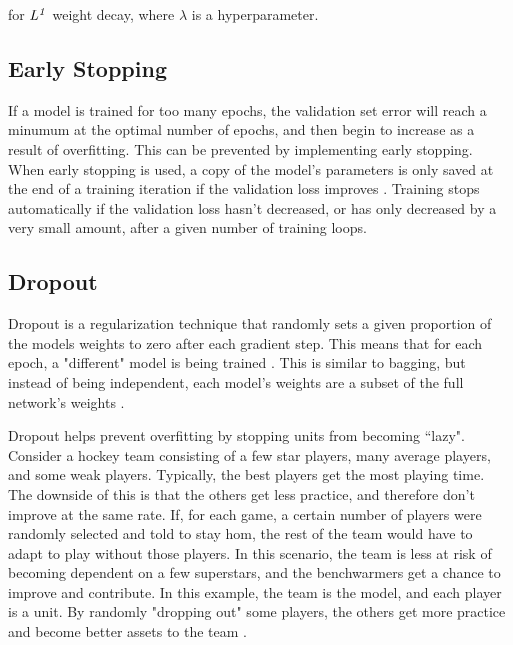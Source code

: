 \documentclass{article}
\begin{document}
for \(\it{L}^1\) weight decay, where \(\lambda\) is a hyperparameter.

\subsection{Early Stopping} %

If a model is trained for too many epochs, the validation set error will reach a minumum at the optimal number of epochs, and then begin to increase as a result of overfitting. This can be prevented by implementing early stopping. When early stopping is used, a copy of the model's parameters is only saved at the end of a training iteration if the validation loss improves \cite{Goodfellow-et-al-2016}. Training stops automatically if the validation loss hasn't decreased, or has only decreased by a very small amount, after a given number of training loops.

\subsection{Dropout} %

Dropout is a regularization technique that randomly sets a given proportion of the models weights to zero after each gradient step. This means that for each epoch, a "different" model is being trained \cite{Srivastava14}. This is similar to bagging, but instead of being independent, each model's weights are a subset of the full network's weights \cite{Goodfellow-et-al-2016}.

Dropout helps prevent overfitting by stopping units from becoming ``lazy". Consider a hockey team consisting of a few star players, many average players, and some weak players. Typically, the best players get the most playing time. The downside of this is that the others get less practice, and therefore don't improve at the same rate. If, for each game, a certain number of players were randomly selected and told to stay hom, the rest of the team would have to adapt to play without those players. In this scenario, the team is less at risk of becoming dependent on a few superstars, and the benchwarmers get a chance to improve and contribute. In this example, the team is the model, and each player is a unit. By randomly "dropping out" some players, the others get more practice and become better assets to the team \cite{hands-on-ml}.
\end{document}
